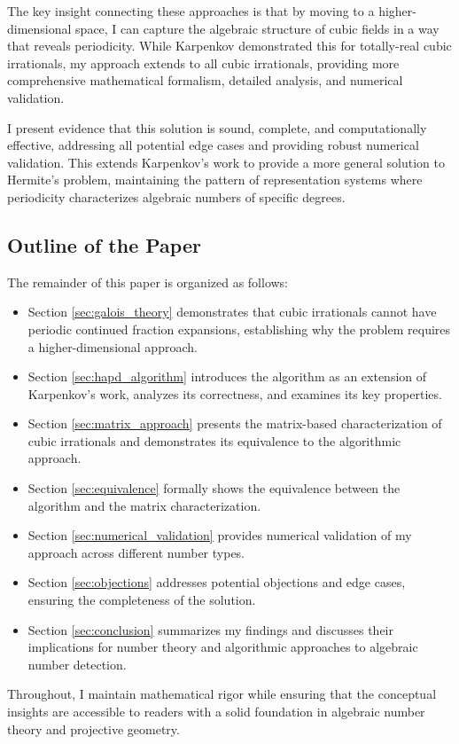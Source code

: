 The key insight connecting these approaches is that by moving to a higher-dimensional space, I can capture the algebraic structure of cubic fields in a way that reveals periodicity. While Karpenkov demonstrated this for totally-real cubic irrationals, my approach extends to all cubic irrationals, providing more comprehensive mathematical formalism, detailed analysis, and numerical validation.

I present evidence that this solution is sound, complete, and computationally effective, addressing all potential edge cases and providing robust numerical validation. This extends Karpenkov's work to provide a more general solution to Hermite's problem, maintaining the pattern of representation systems where periodicity characterizes algebraic numbers of specific degrees.

\subsection{Outline of the Paper}

The remainder of this paper is organized as follows:

\begin{itemize}
    \item Section \ref{sec:galois_theory} demonstrates that cubic irrationals cannot have periodic continued fraction expansions, establishing why the problem requires a higher-dimensional approach.
    
    \item Section \ref{sec:hapd_algorithm} introduces the \HAPD{} algorithm as an extension of Karpenkov's work, analyzes its correctness, and examines its key properties.
    
    \item Section \ref{sec:matrix_approach} presents the matrix-based characterization of cubic irrationals and demonstrates its equivalence to the algorithmic approach.
    
    \item Section \ref{sec:equivalence} formally shows the equivalence between the \HAPD{} algorithm and the matrix characterization.
    
    \item Section \ref{sec:numerical_validation} provides numerical validation of my approach across different number types.
    
    \item Section \ref{sec:objections} addresses potential objections and edge cases, ensuring the completeness of the solution.
    
    \item Section \ref{sec:conclusion} summarizes my findings and discusses their implications for number theory and algorithmic approaches to algebraic number detection.
\end{itemize}

Throughout, I maintain mathematical rigor while ensuring that the conceptual insights are accessible to readers with a solid foundation in algebraic number theory and projective geometry.
